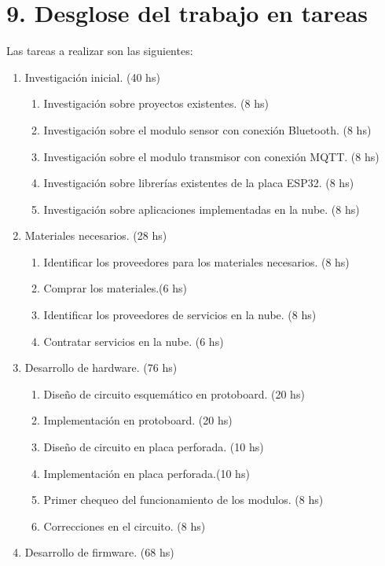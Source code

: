 \documentclass[
11pt, %
]{charter}
\begin{document}
\section{9. Desglose del trabajo en tareas}
\label{sec:wbs}

Las tareas a realizar son las siguientes:

\begin{enumerate}
\item Investigación inicial. (40 hs)
	\begin{enumerate}
	\item Investigación sobre proyectos existentes.	(8 hs)
	\item Investigación sobre el modulo sensor con conexión Bluetooth. (8 hs)
	\item Investigación sobre el modulo transmisor con conexión MQTT. (8 hs)
	\item Investigación sobre librerías existentes de la placa ESP32. (8 hs)
	\item Investigación sobre aplicaciones implementadas en la nube. (8 hs)
	\end{enumerate}
\item Materiales necesarios. (28 hs)
	\begin{enumerate}
	\item Identificar los proveedores para los materiales necesarios. (8 hs)
	\item Comprar los materiales.(6 hs)
	\item Identificar los proveedores de servicios en la nube. (8 hs)
	\item Contratar servicios en la nube. (6 hs)
	\end{enumerate}
\item Desarrollo de hardware. (76 hs)
	\begin{enumerate}
	\item Diseño de circuito esquemático en protoboard. (20 hs)
	\item Implementación en protoboard. (20 hs)
	\item Diseño de circuito en placa perforada. (10 hs)
	\item Implementación en placa perforada.(10 hs)
	\item Primer chequeo del funcionamiento de los modulos. (8 hs)
	\item Correcciones en el circuito. (8 hs)
	\end{enumerate}
\item Desarrollo de firmware. (68 hs)
	\begin{enumerate}

\end{enumerate}
\end{enumerate}
\end{document}
